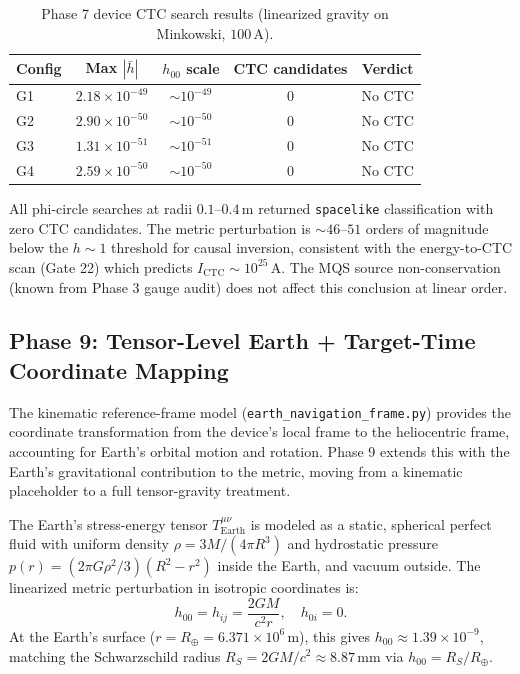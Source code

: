\begin{table}[t]
\centering
\caption{Phase 7 device CTC search results (linearized gravity on Minkowski, $100\,\text{A}$).}
\label{tab:phase7-ctc-search}
\begin{tabular}{lcccc}
\hline
Config & Max $|\bar{h}|$ & $h_{00}$ scale & CTC candidates & Verdict \\
\hline
G1 & $2.18\times 10^{-49}$ & $\sim 10^{-49}$ & 0 & No CTC \\
G2 & $2.90\times 10^{-50}$ & $\sim 10^{-50}$ & 0 & No CTC \\
G3 & $1.31\times 10^{-51}$ & $\sim 10^{-51}$ & 0 & No CTC \\
G4 & $2.59\times 10^{-50}$ & $\sim 10^{-50}$ & 0 & No CTC \\
\hline
\end{tabular}
\end{table}

All phi-circle searches at radii $0.1$--$0.4\,\text{m}$ returned \texttt{spacelike} classification with zero CTC candidates. The metric perturbation is $\sim 46$--$51$ orders of magnitude below the $h\sim 1$ threshold for causal inversion, consistent with the energy-to-CTC scan (Gate 22) which predicts $I_{\text{CTC}} \sim 10^{25}\,\text{A}$. The MQS source non-conservation (known from Phase 3 gauge audit) does not affect this conclusion at linear order.

\subsection{Phase 9: Tensor-Level Earth + Target-Time Coordinate Mapping}

The kinematic reference-frame model (\texttt{earth\_navigation\_frame.py}) provides the coordinate transformation from the device's local frame to the heliocentric frame, accounting for Earth's orbital motion and rotation. Phase 9 extends this with the Earth's gravitational contribution to the metric, moving from a kinematic placeholder to a full tensor-gravity treatment.

The Earth's stress-energy tensor $T^{\mu\nu}_{\text{Earth}}$ is modeled as a static, spherical perfect fluid with uniform density $\rho = 3M/(4\pi R^3)$ and hydrostatic pressure $p(r) = (2\pi G\rho^2/3)(R^2 - r^2)$ inside the Earth, and vacuum outside. The linearized metric perturbation in isotropic coordinates is:
\begin{equation}
h_{00} = h_{ij} = \frac{2GM}{c^2 r}, \quad h_{0i} = 0.
\end{equation}
At the Earth's surface ($r = R_\oplus = 6.371\times 10^6\,\text{m}$), this gives $h_{00} \approx 1.39\times 10^{-9}$, matching the Schwarzschild radius $R_S = 2GM/c^2 \approx 8.87\,\text{mm}$ via $h_{00} = R_S/R_\oplus$.


